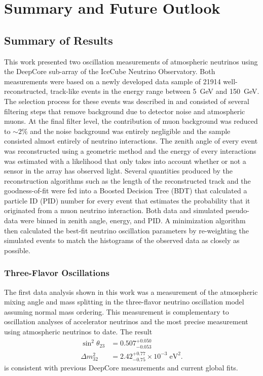 \setchapterpreamble[u]{\margintoc}
\chapter{Summary and Future Outlook}

\section{Summary of Results}
\label{sec:summary}

This work presented two oscillation measurements of atmospheric neutrinos using the DeepCore sub-array of the IceCube Neutrino Observatory. Both measurements were based on a newly developed data sample of \num{21914} well-reconstructed, track-like events in the energy range between \SI{5}{\giga\electronvolt} and \SI{150}{\giga\electronvolt}. The selection process for these events was described in  and consisted of several filtering steps that remove background due to detector noise and atmospheric muons. At the final filter level, the contribution of muon background was reduced to $\sim2\%$ and the noise background was entirely negligible and the sample consisted almost entirely of neutrino interactions. The zenith angle of every event was reconstructed using a geometric method and the energy of every interactions was estimated with a likelihood that only takes into account whether or not a sensor in the array has observed light. %
Several quantities produced by the reconstruction algorithms such as the length of the reconstructed track and the goodness-of-fit were fed into a Boosted Decision Tree (BDT) that calculated a particle ID (PID) number for every event that estimates the probability that it originated from a muon neutrino interaction. Both data and simulated pseudo-data were binned in zenith angle, energy, and PID. A minimization algorithm then calculated the best-fit neutrino oscillation parameters by re-weighting the simulated events to match the histograms of the observed data as closely as possible.

\subsection{Three-Flavor Oscillations}
\label{sec:summary-three-flavor}

The first data analysis shown in this work was a measurement of the atmospheric mixing angle and mass splitting in the three-flavor neutrino oscillation model assuming normal mass ordering. This measurement is complementary to oscillation analyses of accelerator neutrinos and the most precise measurement using atmospheric neutrinos to date. The result
\begin{align*}
    \sin^2\theta_{23} &= 0.507_{-0.053}^{+0.050}\\
    \Delta m^2_{32} &= 2.42_{-0.75}^{+0.77} \times10^{-3}\;\mathrm{eV}^2.
\end{align*}
is consistent with previous DeepCore measurements and current global fits.


